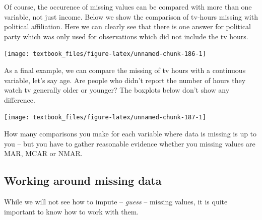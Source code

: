 \documentclass[]{tufte-book}
\newenvironment{Shaded}{}{}
\newcommand{\DataTypeTok}[1]{\textcolor[rgb]{0.56,0.13,0.00}{#1}}
\newcommand{\KeywordTok}[1]{\textcolor[rgb]{0.00,0.44,0.13}{\textbf{#1}}}
\newcommand{\NormalTok}[1]{#1}
\newcommand{\OperatorTok}[1]{\textcolor[rgb]{0.40,0.40,0.40}{#1}}
\newcommand{\StringTok}[1]{\textcolor[rgb]{0.25,0.44,0.63}{#1}}
\begin{document}
Of course, the occurence of missing values can be compared with more than one variable, not just income. Below we show the comparison of tv-hours missing with political affiliation. Here we can clearly see that there is one answer for political party which was only used for observations which did not include the tv hours.

\begin{Shaded}
\end{Shaded}

\texttt{[image: textbook\_files/figure-latex/unnamed-chunk-186-1]}

As a final example, we can compare the missing of tv hours with a continuous variable, let's say age. Are people who didn't report the number of hours they watch tv generally older or younger? The boxplots below don't show any difference.

\begin{Shaded}
\end{Shaded}

\texttt{[image: textbook\_files/figure-latex/unnamed-chunk-187-1]}

How many comparisons you make for each variable where data is missing is up to you -- but you have to gather reasonable evidence whether you missing values are MAR, MCAR or NMAR.

\hypertarget{working-around-missing-data}{%
\subsection{Working around missing data}\label{working-around-missing-data}}

While we will not see how to impute -- \emph{guess} -- missing values, it is quite important to know how to work with them.
\end{document}
